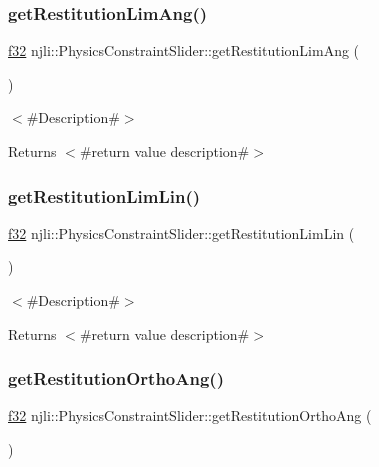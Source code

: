 \subsubsection{\texorpdfstring{get\+Restitution\+Lim\+Ang()}{getRestitutionLimAng()}}
{\footnotesize\ttfamily \mbox{\hyperlink{_util_8h_a5f6906312a689f27d70e9d086649d3fd}{f32}} njli\+::\+Physics\+Constraint\+Slider\+::get\+Restitution\+Lim\+Ang (\begin{DoxyParamCaption}{ }\end{DoxyParamCaption})}

$<$\#\+Description\#$>$

\begin{DoxyReturn}{Returns}
$<$\#return value description\#$>$ 
\end{DoxyReturn}
\mbox{\label{classnjli_1_1_physics_constraint_slider_a7b7d150cda0db00189ecc492373486f0}} 
\subsubsection{\texorpdfstring{get\+Restitution\+Lim\+Lin()}{getRestitutionLimLin()}}
{\footnotesize\ttfamily \mbox{\hyperlink{_util_8h_a5f6906312a689f27d70e9d086649d3fd}{f32}} njli\+::\+Physics\+Constraint\+Slider\+::get\+Restitution\+Lim\+Lin (\begin{DoxyParamCaption}{ }\end{DoxyParamCaption})}

$<$\#\+Description\#$>$

\begin{DoxyReturn}{Returns}
$<$\#return value description\#$>$ 
\end{DoxyReturn}
\mbox{\label{classnjli_1_1_physics_constraint_slider_a0c4a8ac866dc4d7f487d2eb6ea00116c}} 
\subsubsection{\texorpdfstring{get\+Restitution\+Ortho\+Ang()}{getRestitutionOrthoAng()}}
{\footnotesize\ttfamily \mbox{\hyperlink{_util_8h_a5f6906312a689f27d70e9d086649d3fd}{f32}} njli\+::\+Physics\+Constraint\+Slider\+::get\+Restitution\+Ortho\+Ang (\begin{DoxyParamCaption}{ }\end{DoxyParamCaption})}

